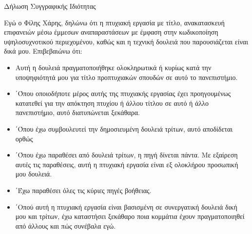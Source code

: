 \thispagestyle{empty}
\begin{center}
    \huge{Δήλωση Συγγραφικής Ιδιότητας}
\end{center}
\vspace{1cm}
Εγώ ο Φίλης Χάρης, δηλώνω ότι η πτυχιακή εργασία με τίτλο,  ανακατασκευή επιφανειών μέσω έμμεσων αναπαραστάσεων με έμφαση στην κωδικοποίηση υψηλοσυχνοτικού περιεχομένου, καθώς και η τεχνική δουλειά που παρουσιάζεται είναι δικά μου. Επιβεβαιώνω ότι:
\vspace{1cm}
\begin{itemize}
    \item Αυτή η δουλειά πραγματοποιήθηκε ολοκληρωτικά ή κυρίως κατά την υποψηφιότητά
μου για τίτλο προπτυχιακών σπουδών σε αυτό το πανεπιστήμιο.
    \item ΄Όπου οποιοδήποτε μέρος αυτής της πτυχιακής εργασίας έχει προηγουμένως κατατεθεί για την απόκτηση πτυχίου ή άλλου τίτλου σε αυτό ή άλλο πανεπιστήμιο, αυτό διατυπώνεται ξεκάθαρα.
    \item ΄Όπου έχω συμβουλευτεί την δημοσιευμένη δουλειά τρίτων, αυτό αποδίδεται ορθώς
    \item ΄Όπου  έχω παραθέσει από δουλειά τρίτων, η πηγή δίνεται πάντα. Με εξαίρεση αυτές τις παραθέσεις, αυτή η πτυχιακή εργασία είναι εξ ολοκλήρου προσωπική μου δουλειά.
    \item ΄Έχω παραθέσει όλες τις κύριες πηγές βοήθειας.
    \item ΄Οπού αυτή η πτυχιακή εργασία είναι βασισμένη σε συνεργατική δουλειά δική μου και τρίτων, έχω καταστήσει ξεκάθαρο ποια κομμάτια έχουν πραγματοποιηθεί από άλλους και πώς συνέβαλα εγώ.
\end{itemize}


